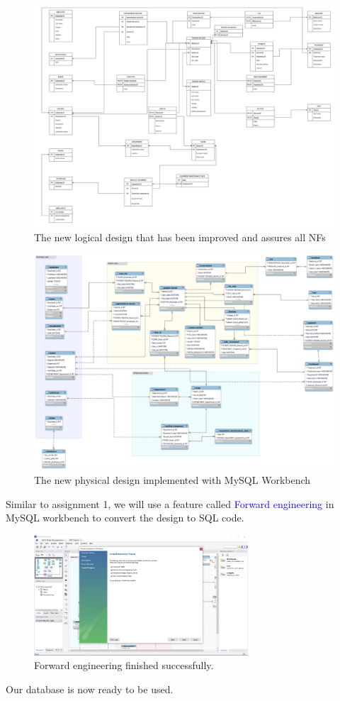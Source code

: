 \documentclass[a4paper]{article}
\numberwithin{equation}{section}
\begin{document}
\begin{figure}[H]
  \centering
  \includegraphics[width = 12cm ]{assets/newLogicalDesign.png}
  \captionsetup{justification=centering,margin=2cm}
  \caption{The new logical design that has been improved and assures all NFs}
\end{figure}

\newpage
\begin{figure}[H]
  \centering
  \includegraphics[width = 12cm]{assets/New_logcial_design.png}
  \captionsetup{justification=centering,margin=2cm}
  \caption{The new physical design implemented with MySQL Workbench}
\end{figure}

Similar to assignment 1, we will use a feature called \textcolor{blue}{Forward engineering } in MySQL workbench to convert the design to SQL code.

\begin{figure}[H]
  \centering
  \includegraphics[width = 8cm]{assets/step2.png}
  \captionsetup{justification=centering,margin=2cm}
  \caption{Forward engineering finished successfully.}
\end{figure}
Our database is now ready to be used.
\end{document}

